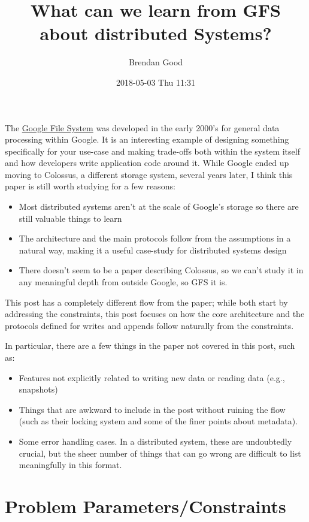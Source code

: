 \documentclass[11pt]{article}
\author{Brendan Good}
\date{2018-05-03 Thu 11:31}
\title{What can we learn from GFS about distributed Systems?}
\begin{document}
\maketitle
The \href{https://static.googleusercontent.com/media/research.google.com/en//archive/gfs-sosp2003.pdf}{Google File System} was developed in the early 2000's for general data processing within Google. It is an interesting example of
designing something specifically for your use-case and making trade-offs both within the system itself and how developers write application code around it.
While Google ended up moving to Colossus, a different storage system, several years later, I think this paper is still worth studying for a few reasons:
\begin{itemize}
\item Most distributed systems aren't at the scale of Google's storage so there are still valuable things to learn
\item The architecture and the main protocols follow from the assumptions in a natural way, making it a useful case-study for distributed systems design
\item There doesn't seem to be a paper describing Colossus, so we can't study it in any meaningful depth from outside Google, so GFS it is.
\end{itemize}

This post has a completely different flow from the paper; while both start by addressing the constraints, this post focuses on how the core architecture
and the protocols defined for writes and appends follow naturally from the constraints.

In particular, there are a few things in the paper not covered in this post, such as:
\begin{itemize}
\item Features not explicitly related to writing new data or reading data (e.g., snapshots)
\item Things that are awkward to include in the post without ruining the flow (such as their locking system and some of the finer points about metadata).
\item Some error handling cases. In a distributed system, these are undoubtedly crucial, but the sheer number of things that can go wrong are difficult
to list meaningfully in this format.
\end{itemize}

\section*{Problem Parameters/Constraints}
\label{sec:orgb878b23}
\end{document}
